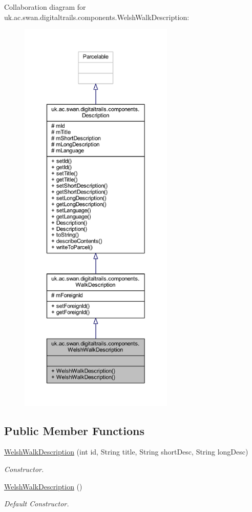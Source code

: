 Collaboration diagram for uk.\+ac.\+swan.\+digitaltrails.\+components.\+Welsh\+Walk\+Description\+:
\nopagebreak
\begin{figure}[H]
\begin{center}
\leavevmode
\includegraphics[height=550pt]{classuk_1_1ac_1_1swan_1_1digitaltrails_1_1components_1_1_welsh_walk_description__coll__graph}
\end{center}
\end{figure}
\subsection*{Public Member Functions}
\begin{DoxyCompactItemize}
\item 
\hyperlink{classuk_1_1ac_1_1swan_1_1digitaltrails_1_1components_1_1_welsh_walk_description_a2d25bb55ff7f5e41fe86f5a155aeeae9}{Welsh\+Walk\+Description} (int id, String title, String short\+Desc, String long\+Desc)
\begin{DoxyCompactList}\small\item\em Constructor. \end{DoxyCompactList}\item 
\hyperlink{classuk_1_1ac_1_1swan_1_1digitaltrails_1_1components_1_1_welsh_walk_description_a27635e3b6262e73d473ddaa9ffccad91}{Welsh\+Walk\+Description} ()
\begin{DoxyCompactList}\small\item\em Default Constructor. \end{DoxyCompactList}\end{DoxyCompactItemize}
